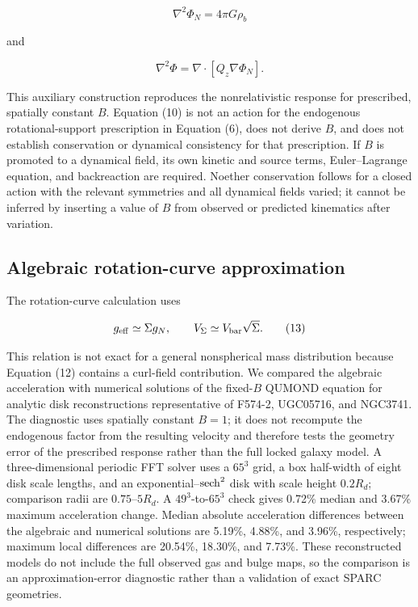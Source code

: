 \documentclass[utf8]{FrontiersinHarvard}
\begin{document}
\[
\nabla^2\Phi_N=4\pi G\rho_b
\tag{11}
\]

and

\[
\nabla^2\Phi=\nabla\cdot\left[Q_z\nabla\Phi_N\right].
\tag{12}
\]

This auxiliary construction reproduces the nonrelativistic response for prescribed, spatially constant \(B\). Equation (10) is not an action for the endogenous rotational-support prescription in Equation (6), does not derive \(B\), and does not establish conservation or dynamical consistency for that prescription. If \(B\) is promoted to a dynamical field, its own kinetic and source terms, Euler--Lagrange equation, and backreaction are required. Noether conservation follows for a closed action with the relevant symmetries and all dynamical fields varied; it cannot be inferred by inserting a value of \(B\) from observed or predicted kinematics after variation.

\subsection{Algebraic rotation-curve approximation}\label{algebraic-rotation-curve-approximation}

The rotation-curve calculation uses

\[
g_{\rm eff}\simeq\Sigma g_N,\qquad
V_\Sigma\simeq V_{\rm bar}\sqrt{\Sigma}.
\tag{13}
\]

This relation is not exact for a general nonspherical mass distribution because Equation (12) contains a curl-field contribution. We compared the algebraic acceleration with numerical solutions of the fixed-\(B\) QUMOND equation for analytic disk reconstructions representative of F574-2, UGC05716, and NGC3741. The diagnostic uses spatially constant \(B=1\); it does not recompute the endogenous factor from the resulting velocity and therefore tests the geometry error of the prescribed response rather than the full locked galaxy model. A three-dimensional periodic FFT solver uses a \(65^3\) grid, a box half-width of eight disk scale lengths, and an exponential--\({\rm sech}^2\) disk with scale height \(0.2R_d\); comparison radii are \(0.75\)--\(5R_d\). A \(49^3\)-to-\(65^3\) check gives 0.72\% median and 3.67\% maximum acceleration change. Median absolute acceleration differences between the algebraic and numerical solutions are 5.19\%, 4.88\%, and 3.96\%, respectively; maximum local differences are 20.54\%, 18.30\%, and 7.73\%. These reconstructed models do not include the full observed gas and bulge maps, so the comparison is an approximation-error diagnostic rather than a validation of exact SPARC geometries.
\end{document}
